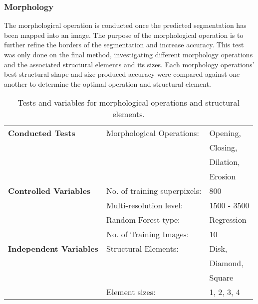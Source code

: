 \subsubsection{Morphology}
The morphological operation is conducted once the predicted segmentation has been mapped into an image. The purpose of the morphological operation is to further refine the borders of the segmentation and increase accuracy. This test was only done on the final method, investigating different morphology operations and the associated structural elements and its sizes. Each morphology operations' best structural shape and size produced accuracy were compared against one another to determine the optimal operation and structural element.

\begin{table}[H]
\centering
\caption{Tests and variables for morphological operations and structural elements.}

\begin{tabular}{|l|ll|}
\hline
\textbf{Conducted Tests}	 & Morphological Operations: & Opening,\\
	& 	& Closing,\\ 
	&	& Dilation,\\
	&	& Erosion\\
\hline
\textbf{Controlled Variables} & No. of training superpixels: & 800 \\
	 & Multi-resolution level: & 1500 - 3500\\
	 & Random Forest type: & Regression\\	
	 &  No. of Training Images: & 10\\
\hline
\textbf{Independent Variables} & Structural Elements: & Disk, \\
	& 	& Diamond,\\
	&	& Square\\
	& Element sizes: & 1, 2, 3, 4\\
\hline				    	 			   			    	 
\end{tabular}
\label{table:morphtest}
\end{table}

